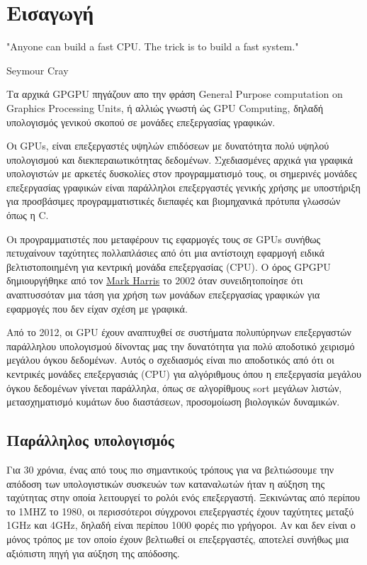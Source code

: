 \chapter{Εισαγωγή}
\epigraph{"Anyone can build a fast CPU. The trick is to build a fast system."}{Seymour Cray}
Τα αρχικά GPGPU πηγάζουν απο την φράση General Purpose computation on Graphics Processing Units, ή αλλιώς γνωστή ώς GPU Computing, δηλαδή υπολογισμός γενικού σκοπού σε μονάδες επεξεργασίας γραφικών.

Οι GPUs, είναι επεξεργαστές υψηλών επιδόσεων με δυνατότητα πολύ υψηλού υπολογισμού και διεκπεραιωτικότητας δεδομένων. Σχεδιασμένες αρχικά για γραφικά υπολογιστών με αρκετές δυσκολίες στον προγραμματισμό τους, οι σημερινές μονάδες επεξεργασίας γραφικών είναι παράλληλοι επεξεργαστές γενικής χρήσης με υποστήριξη για προσβάσιμες προγραμματιστικές διεπαφές και βιομηχανικά πρότυπα γλωσσών όπως η C.

Οι προγραμματιστές που μεταφέρουν τις εφαρμογές τους σε GPUs συνήθως πετυχαίνουν ταχύτητες πολλαπλάσιες από ότι μια αντίστοιχη εφαρμογή ειδικά βελτιστοποιημένη για κεντρική μονάδα επεξεργασίας (CPU).
Ο όρος GPGPU δημιουργήθηκε από τον \href{http://en.wikipedia.org/wiki/Mark_Harris_(programmer)}{Mark Harris} το 2002 όταν συνειδητοποίησε ότι αναπτυσσόταν μια τάση για χρήση των μονάδων επεξεργασίας γραφικών για εφαρμογές που δεν είχαν σχέση με γραφικά. 

Από το 2012, οι GPU έχουν αναπτυχθεί σε συστήματα πολυπύρηνων επεξεργαστών παράλληλου υπολογισμού δίνοντας μας την δυνατότητα για πολύ αποδοτικό χειρισμό μεγάλου όγκου δεδομένων. Αυτός ο σχεδιασμός είναι πιο αποδοτικός από ότι οι κεντρικές μονάδες επεξεργασιάς (CPU) για αλγόριθμους όπου η επεξεργασία μεγάλου όγκου δεδομένων γίνεται παράλληλα, όπως σε αλγορίθμους sort μεγάλων λιστών, μετασχηματισμό κυμάτων δυο διαστάσεων, προσομοίωση βιολογικών δυναμικών.
\section{Παράλληλος υπολογισμός}
Για 30 χρόνια, ένας από τους πιο σημαντικούς τρόπους για να βελτιώσουμε την απόδοση των υπολογιστικών συσκευών των καταναλωτών ήταν η αύξηση της ταχύτητας στην οποία λειτουργεί το ρολόι ενός επεξεργαστή. Ξεκινώντας από περίπου το 1MHZ το 1980, οι περισσότεροι σύγχρονοι επεξεργαστές έχουν ταχύτητες μεταξύ 1GHz και 4GHz, δηλαδή είναι περίπου 1000 φορές πιο γρήγοροι. Αν και δεν είναι ο μόνος τρόπος με τον οποίο έχουν βελτιωθεί οι επεξεργαστές, αποτελεί συνήθως μια αξιόπιστη πηγή για αύξηση της απόδοσης.

